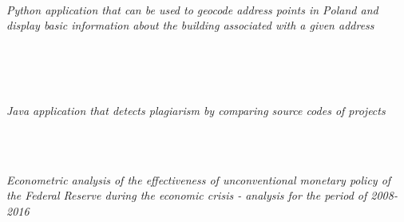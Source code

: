 \documentclass{cls/gml_cv_sets}
\begin{document}
\begin{paracol}{2}
{{ 
  \\
  \\ \vspace{0.6em}

 \\ 

\textit{\footnotesize Python application that can be used to geocode address 
points in Poland and display basic information about the building associated 
with a given address} \\ \vspace{-0.75em}

 \\
 \\ \vspace{0.6em}

 \\

\textit{\footnotesize Java application that detects plagiarism by comparing 
source codes of projects} \\ \vspace{-0.75em}

 \\ \vspace{0.6em}

 \\ 

\textit{\footnotesize Econometric analysis of the effectiveness of 
unconventional monetary policy of the Federal Reserve during the economic 
crisis - analysis for the period of 2008-2016} \\ \vspace{-0.75em}

}}
\end{paracol}
\end{document}
